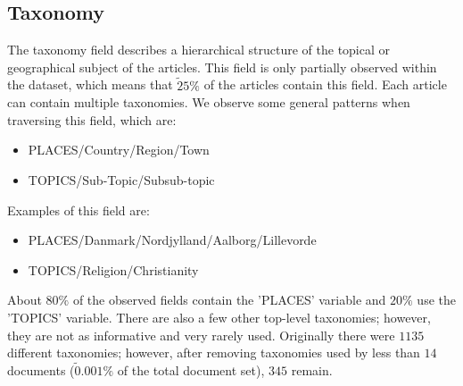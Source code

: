 \subsection{Taxonomy}
The taxonomy field describes a hierarchical structure of the topical or geographical subject of the articles.
This field is only partially observed within the dataset, which means that $\tilde 25\%$ of the articles contain this field.
Each article can contain multiple taxonomies.
We observe some general patterns when traversing this field, which are:
\begin{itemize}
	\item PLACES/Country/Region/Town
	\item TOPICS/Sub-Topic/Subsub-topic
\end{itemize}
Examples of this field are:
\begin{itemize}
	\item PLACES/Danmark/Nordjylland/Aalborg/Lillevorde
	\item TOPICS/Religion/Christianity
\end{itemize}
About $80\%$ of the observed fields contain the 'PLACES' variable and $20\%$ use the 'TOPICS' variable.
There are also a few other top-level taxonomies; however, they are not as informative and very rarely used.
Originally there were $1135$ different taxonomies; however, after removing taxonomies used by less than $14$ documents ($\tilde 0.001\%$ of the total document set), $345$ remain.

